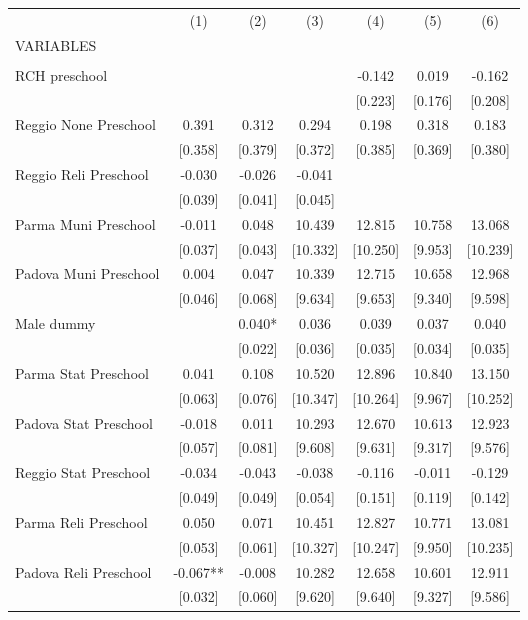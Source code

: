 \begin{tabular}{lcccccc} \hline
 & (1) & (2) & (3) & (4) & (5) & (6) \\
VARIABLES &  &  &  &  &  &  \\ \hline
 &  &  &  &  &  &  \\
RCH preschool &  &  &  & -0.142 & 0.019 & -0.162 \\
 &  &  &  & [0.223] & [0.176] & [0.208] \\
Reggio None Preschool & 0.391 & 0.312 & 0.294 & 0.198 & 0.318 & 0.183 \\
 & [0.358] & [0.379] & [0.372] & [0.385] & [0.369] & [0.380] \\
Reggio Reli Preschool & -0.030 & -0.026 & -0.041 &  &  &  \\
 & [0.039] & [0.041] & [0.045] &  &  &  \\
Parma Muni Preschool & -0.011 & 0.048 & 10.439 & 12.815 & 10.758 & 13.068 \\
 & [0.037] & [0.043] & [10.332] & [10.250] & [9.953] & [10.239] \\
Padova Muni Preschool & 0.004 & 0.047 & 10.339 & 12.715 & 10.658 & 12.968 \\
 & [0.046] & [0.068] & [9.634] & [9.653] & [9.340] & [9.598] \\
Male dummy &  & 0.040* & 0.036 & 0.039 & 0.037 & 0.040 \\
 &  & [0.022] & [0.036] & [0.035] & [0.034] & [0.035] \\
Parma Stat Preschool & 0.041 & 0.108 & 10.520 & 12.896 & 10.840 & 13.150 \\
 & [0.063] & [0.076] & [10.347] & [10.264] & [9.967] & [10.252] \\
Padova Stat Preschool & -0.018 & 0.011 & 10.293 & 12.670 & 10.613 & 12.923 \\
 & [0.057] & [0.081] & [9.608] & [9.631] & [9.317] & [9.576] \\
Reggio Stat Preschool & -0.034 & -0.043 & -0.038 & -0.116 & -0.011 & -0.129 \\
 & [0.049] & [0.049] & [0.054] & [0.151] & [0.119] & [0.142] \\
Parma Reli Preschool & 0.050 & 0.071 & 10.451 & 12.827 & 10.771 & 13.081 \\
 & [0.053] & [0.061] & [10.327] & [10.247] & [9.950] & [10.235] \\
Padova Reli Preschool & -0.067** & -0.008 & 10.282 & 12.658 & 10.601 & 12.911 \\
 & [0.032] & [0.060] & [9.620] & [9.640] & [9.327] & [9.586] \\

\end{tabular}
